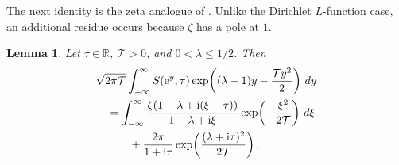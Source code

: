 \documentclass[12pt,reqno]{amsart}
\newtheorem{lemma}[theorem]{Lemma}
\theoremstyle{remark}
\numberwithin{equation}{section}
\newcommand{\R}{\mathbb R}
\newcommand{\e}{\mathrm e}
\newcommand{\ii}{\mathrm i}
\begin{document}
The next identity is the zeta analogue of \cite[Lemma 3.2]{GS18}.  Unlike the Dirichlet $L$-function case, an additional residue occurs because $\zeta$ has a pole at $1$.

\begin{lemma}\label{lem:gaussian}
Let $\tau\in\R$, $\mathcal T>0$, and $0<\lambda\le1/2$.  Then
\begin{align}
&\sqrt{2\pi\mathcal T}
\int_{-\infty}^{\infty}
S(\e^y,\tau)
\exp\!\left((\lambda-1)y-\frac{\mathcal T y^2}{2}\right)\,dy \notag\\
&\quad=
\int_{-\infty}^{\infty}
\frac{\zeta(1-\lambda+\ii(\xi-\tau))}{1-\lambda+\ii\xi}
\exp\!\left(-\frac{\xi^2}{2\mathcal T}\right)\,d\xi \notag\\
&\qquad\quad+
\frac{2\pi}{1+\ii\tau}
\exp\!\left(\frac{(\lambda+\ii\tau)^2}{2\mathcal T}\right).
\label{eq:gaussian-transform}
\end{align}
\end{lemma}
\end{document}
